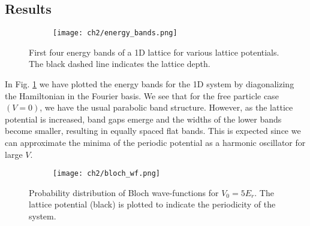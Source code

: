 \subsection{Results}
\begin{figure}[!htb]
    \centering
    \begin{subfigure}[b]{\textwidth}  %
        \centering
        \texttt{[image: ch2/energy\_bands.png]}
    \end{subfigure}
    \caption{First four energy bands of a 1D lattice for various lattice potentials. The black dashed line indicates the lattice depth.}
    \label{fig:bands}
\end{figure}
\FloatBarrier \!\!\!\!\!\!\!\!\!\!\!

In Fig. \ref{fig:bands} we have plotted the energy bands for the 1D system by diagonalizing the Hamiltonian in the Fourier basis. We see that for the free particle case $(V=0)$, we have the usual parabolic band structure. However, as the lattice potential is increased, band gaps emerge and the widths of the lower bands become smaller, resulting in equally spaced flat bands. This is expected since we can approximate the minima of the periodic potential as a harmonic oscillator for large $V$. 
\begin{figure}[!htb]
    \centering
    \begin{subfigure}[b]{\textwidth}  %
        \centering
        \texttt{[image: ch2/bloch\_wf.png]}
    \end{subfigure}
    \caption{Probability distribution of Bloch wave-functions for $V_0 = 5E_r$. The lattice potential (black) is plotted to indicate the periodicity of the system.}
    \label{fig:bloch}    
\end{figure}
\FloatBarrier \!\!\!\!\!\!\!\!\!\!\!

